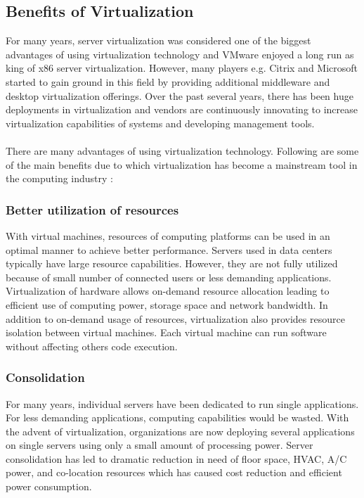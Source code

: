 \subsection{Benefits of Virtualization\label{sec:uses}}
For many years, server virtualization was considered one of the biggest advantages of using virtualization technology and VMware enjoyed a long run as king of x86 server virtualization. However, many players e.g. Citrix and Microsoft started to gain ground in this field by providing additional middleware and desktop virtualization offerings. Over the past several years, there has been huge deployments in virtualization and vendors are continuously innovating to increase virtualization capabilities of systems and developing management tools.\\
\\
There are many advantages of using virtualization technology. Following are some of the main benefits due to which virtualization has become a mainstream tool in the computing industry \cite{reasonstousevirtualization}:


\subsubsection{Better utilization of resources \label{sec:resource optimization}}
With virtual machines, resources of computing platforms can be used in an optimal manner to achieve better performance. Servers used in data centers typically have large resource capabilities. However, they are not fully utilized because of small number of connected users or less demanding applications. Virtualization of hardware allows on-demand resource allocation leading to efficient use of computing power, storage space and network bandwidth. In addition to on-demand usage of resources, virtualization also provides resource isolation between virtual machines. Each virtual machine can run software without affecting others code execution. 

\subsubsection{Consolidation \label{sec:Consolidation}}
For many years, individual servers have been dedicated to run single applications. For less demanding applications, computing capabilities would be wasted. With the advent of virtualization, organizations are now deploying several applications on single servers using only a small amount of processing power. Server consolidation has led to dramatic reduction in need of floor space, HVAC, A/C power, and co-location resources which has caused cost reduction and efficient power consumption.

